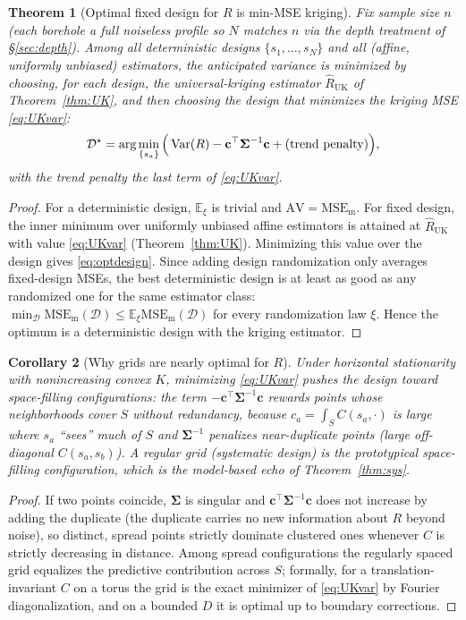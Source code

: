 \documentclass{amsart}
\newtheorem{theorem}{Theorem}
\newtheorem{corollary}[theorem]{Corollary}
\theoremstyle{definition}
\newcommand{\E}{\mathbb{E}}
\newcommand{\Var}{\operatorname{Var}}
\newcommand{\Rhat}{\widehat R}
\begin{document}
\begin{theorem}[Optimal fixed design for $R$ is min-MSE
kriging]\label{thm:anticipated}
Fix sample size $n$ (each borehole a full noiseless profile so $N$ matches
$n$ via the depth treatment of \S\ref{sec:depth}). Among all
\emph{deterministic} designs $\{s_1,\dots,s_N\}$ and all (affine, uniformly
unbiased) estimators, the anticipated variance is minimized by choosing,
\emph{for each design}, the universal-kriging estimator
$\Rhat_{\mathrm{UK}}$ of Theorem~\ref{thm:UK}, and then choosing the
design that minimizes the kriging MSE \eqref{eq:UKvar}:
\begin{equation}\label{eq:optdesign}
\mathcal D^\star
=\arg\min_{\{s_a\}}
\Big(\Var(R)-\mathbf c^\top\boldsymbol\Sigma^{-1}\mathbf c
+\text{\rm(trend penalty)}\Big),
\end{equation}
with the trend penalty the last term of \eqref{eq:UKvar}.
\end{theorem}
\begin{proof}
For a deterministic design, $\E_\xi$ is trivial and
$\mathrm{AV}=\mathrm{MSE}_{\mathrm m}$. For fixed design, the inner minimum
over uniformly unbiased affine estimators is attained at
$\Rhat_{\mathrm{UK}}$ with value \eqref{eq:UKvar}
(Theorem~\ref{thm:UK}). Minimizing this value over the design gives
\eqref{eq:optdesign}. Since adding design randomization only averages
fixed-design MSEs, the best deterministic design is at least as good as any
randomized one for the same estimator class:
$\min_{\mathcal D}\mathrm{MSE}_{\mathrm m}(\mathcal D)
\le \E_\xi \mathrm{MSE}_{\mathrm m}(\mathcal D)$ for every randomization
law $\xi$. Hence the optimum is a deterministic design with the kriging
estimator.
\end{proof}

\begin{corollary}[Why grids are nearly optimal for $R$]
Under horizontal stationarity with nonincreasing convex $K$, minimizing
\eqref{eq:UKvar} pushes the design toward \emph{space-filling}
configurations: the term $-\mathbf c^\top\boldsymbol\Sigma^{-1}\mathbf c$
rewards points whose neighborhoods cover $S$ without redundancy, because
$c_a=\int_S C(s_a,\cdot)$ is large where $s_a$ ``sees'' much of $S$ and
$\boldsymbol\Sigma^{-1}$ penalizes near-duplicate points (large
off-diagonal $C(s_a,s_b)$). A regular grid (systematic design) is the
prototypical space-filling configuration, which is the model-based echo of
Theorem~\ref{thm:sys}.
\end{corollary}
\begin{proof}
If two points coincide, $\boldsymbol\Sigma$ is singular and
$\mathbf c^\top\boldsymbol\Sigma^{-1}\mathbf c$ does not increase by adding
the duplicate (the duplicate carries no new information about $R$ beyond
noise), so distinct, spread points strictly dominate clustered ones
whenever $C$ is strictly decreasing in distance. Among spread
configurations the regularly spaced grid equalizes the predictive
contribution across $S$; formally, for a translation-invariant $C$ on a
torus the grid is the exact minimizer of \eqref{eq:UKvar} by Fourier
diagonalization, and on a bounded $D$ it is optimal up to boundary
corrections. \end{proof}
\end{document}
